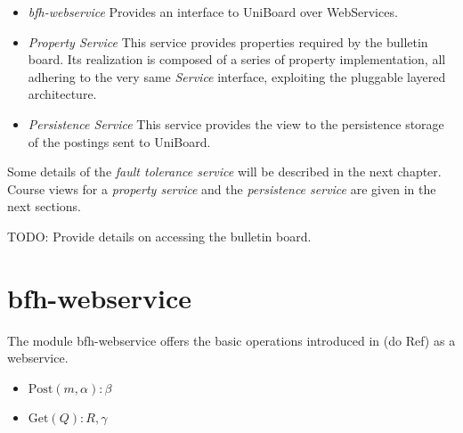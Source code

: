 \documentclass[oneside]{scrreprt}
\newcommand{\uniboard}{\mbox{UniBoard}}
\newcommand{\fig}[1]{Figure~\ref{#1}}
\begin{document}
\begin{itemize}
	\item \emph{bfh-webservice} Provides an interface to UniBoard over WebServices.
	\item \emph{Property Service} This service provides properties required by the bulletin board. Its
		realization is composed of a series of property
		implementation, all adhering to the very same
		\emph{Service} interface, exploiting the pluggable
		layered architecture.
	\item \emph{Persistence Service} This service provides
		the view to the persistence storage of the postings
		sent to \uniboard.
\end{itemize}

Some details of the \emph{fault tolerance service} will be described
in the next chapter. Course views for a \emph{property service}
and the \emph{persistence service} are given in the next sections.

TODO: Provide details on accessing the bulletin board.

\section{bfh-webservice}
The module bfh-webservice offers the basic operations introduced in (do Ref) as a webservice.
\begin{itemize}
	\item $\mathrm{Post}(m,\alpha):\beta$
	\item $\mathrm{Get}(Q):R, \gamma$
\end{itemize}

%
%
%
%
%
\end{document}
